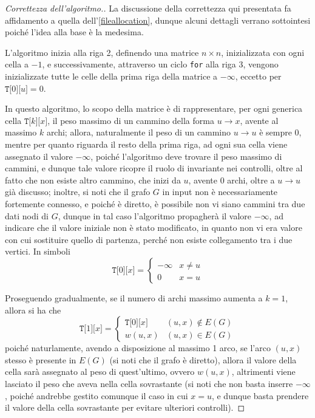 \documentclass[a4paper, 12pt]{report}
\begin{document}
    \begin{proof}[Correttezza dell'algoritmo.]
        La discussione della correttezza qui presentata fa affidamento a quella dell'\cref{fileallocation}, dunque alcuni dettagli verrano sottointesi poiché l'idea alla base è la medesima.

        L'algoritmo inizia alla riga 2, definendo una matrice $n \times n$, inizializzata con ogni cella a $-1$, e successivamente, attraverso un ciclo \texttt{for} alla riga 3, vengono inizializzate tutte le celle della prima riga della matrice a $- \infty$, eccetto per $\texttt{T[}0\texttt{][}u\texttt{]}=0$.

        In questo algoritmo, lo scopo della matrice è di rappresentare, per ogni generica cella $\texttt{T[}k\texttt{][}x\texttt{]}$, il peso massimo di un cammino della forma $u \rightarrow x$, avente al massimo $k$ archi; allora, naturalmente il peso di un cammino $u \rightarrow u$ è sempre 0, mentre per quanto riguarda il resto della prima riga, ad ogni sua cella viene assegnato il valore $- \infty$, poiché l'algoritmo deve trovare il peso massimo di cammini, e dunque tale valore ricopre il ruolo di invariante nei controlli, oltre al fatto che non esiste altro cammino, che inizi da $u$, avente 0 archi, oltre a $u \rightarrow u$ già discusso; inoltre, si noti che il grafo $G$ in input non è necessariamente fortemente connesso, e poiché è diretto, è possibile non vi siano cammini tra due dati nodi di $G$, dunque in tal caso l'algoritmo propagherà il valore $- \infty$, ad indicare che il valore iniziale non è stato modificato, in quanto non vi era valore con cui sostituire quello di partenza, perché non esiste collegamento tra i due vertici. In simboli $$\texttt{T[}0\texttt{][}x\texttt{]} = \left \{ \begin{array}{ll} - \infty & x \neq u \\ 0 & x = u \end{array} \right.$$

        Proseguendo gradualmente, se il numero di archi massimo aumenta a $k =1$, allora si ha che $$\texttt{T[}1\texttt{][}x\texttt{]} = \left \{ \begin{array}{ll} \texttt{T[}0\texttt{][}x\texttt{]} & (u, x) \notin E(G) \\ w(u, x) & (u, x) \in E(G) \end{array} \right .$$ poiché naturlamente, avendo a disposizione al massimo 1 arco, se l'arco $(u, x)$ stesso è presente in $E(G)$ (si noti che il grafo è diretto), allora il valore della cella sarà assegnato al peso di quest'ultimo, ovvero $w(u, x)$, altrimenti viene lasciato il peso che aveva nella cella sovrastante (si noti che non basta inserre $- \infty$, poiché andrebbe gestito comunque il caso in cui $x = u$, e dunque basta prendere il valore della cella sovrastante per evitare ulteriori controlli).


\end{proof}
\end{document}
